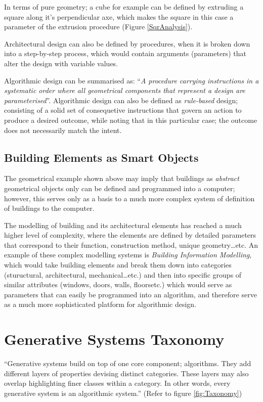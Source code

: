 In terms of pure geometry; a cube for example can be defined by extruding a square along it's perpendicular axe, which makes the square in this case a parameter of the extrusion procedure (Figure \ref{SqrAnalysis}).

Architectural design can also be defined by procedures, when it is broken down into a step-by-step process, which would contain arguments (parameters) that alter the design with variable values. \label{SequentialAlgorithms}

Algorithmic design can be summarised as: ``\emph{A procedure carrying instructions in a systematic order where all geometrical components that represent a design are parameterised}''\cite{hernandez06}. Algorithmic design can also be defined as \emph{rule-based} design; consisting of a solid set of consequetive instructions that govern an action to produce a desired outcome, while noting that in this particular case; the outcome does not necessarily match the intent.

\subsection{Building Elements as Smart Objects}

The geometrical example shown above may imply that buildings as \emph{abstract} geometrical objects only can be defined and programmed into a computer; however, this serves only as a basis to a much more complex system of definition of buildings to the computer. 

The modelling of building and its architectural elements has reached a much higher level of complexity, where the elements are defined by detailed parameters that correspond to their function, construction method, unique geometry\ldots{}etc. An example of these complex modelling systems is \emph{Building Information Modelling}, which would take building elements and break them down into categories (stuructural, architectural, mechanical\ldots{}etc.) and then into specific groups of similar attributes (windows, doors, walls, floors\ldot{}etc.) which would serve as parameters that can easily be programmed into an algorithm, and therefore serve as a much more sophisticated platform for algorithmic design.

\section{Generative Systems Taxonomy}

\label{GenSysTax}
``Generative systems build on top of one core component; algorithms. They add different layers of properties devising distinct categories. These layers may also overlap highlighting finer classes within a category. In other words, every generative system is an algorithmic system.'' \cite{khaldi04} (Refer to figure \ref{fig:Taxonomy})

